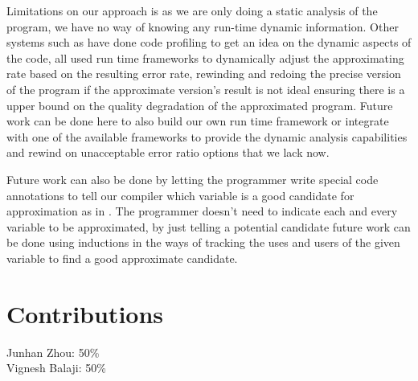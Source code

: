 \documentclass[12pt,conference]{IEEEtran}
\begin{document}
Limitations on our approach is as we are only doing a static analysis of the program,
we have no way of knowing any run-time dynamic information. Other systems such as 
\cite{green}\cite{chisel} have done code profiling to get an idea on the dynamic 
aspects of the code, \cite{ibm}\cite{helixup}\cite{paraprox}\cite{green} all used 
run time frameworks to dynamically adjust the approximating rate based on the 
resulting error rate, rewinding and redoing the precise version of the program 
if the approximate version's result is not ideal ensuring there is a upper
bound on the quality degradation of the approximated program. Future work can be 
done here to also build our own run time framework or integrate with one of the 
available frameworks to provide the dynamic analysis capabilities and rewind on 
unacceptable error ratio options that we lack now.

Future work can also be done by letting the programmer write special code annotations
to tell our compiler which variable is a good candidate for approximation as in
\cite{enerJ}\cite{accept}\cite{chisel}. The programmer doesn't need to indicate 
each and every variable to be approximated, by just telling a potential candidate 
future work can be done using inductions in the ways of \cite{chisel}\cite{stochastic}
tracking the uses and users of the given variable to find a good approximate 
candidate.

\section{Contributions}

Junhan Zhou: 50\%\\
Vignesh Balaji: 50\%




%
%
\end{document}
